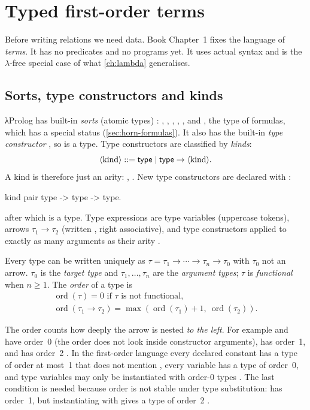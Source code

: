 \section{Typed first-order terms}\label{sec:horn-terms}

Before writing relations we need data. Book Chapter~1 fixes the language of \emph{terms}. It has no
predicates and no programs yet. It uses actual  syntax and is the $\lambda$-free special
case of what \cref{ch:lambda} generalises.

\subsection{Sorts, type constructors and kinds}

λProlog has built-in \emph{sorts} (atomic types) : , , ,
, , and , the type of formulas, which has a special status
(\cref{sec:horn-formulas}). It also has the built-in \emph{type constructor} , so 
is a type. Type constructors are classified by \emph{kinds}:
\[
  \langle\text{kind}\rangle ::= \mathsf{type} \mid \mathsf{type}\to\langle\text{kind}\rangle .
\]
A kind is therefore just an arity: , . New type constructors are
declared with  :
\begin{lprolog}
kind  pair  type -> type -> type.
\end{lprolog}
after which  is a type. Type expressions are type variables (uppercase tokens),
arrows $\tau_1\to\tau_2$ (written \lp{->}, right associative), and type constructors applied to exactly as
many arguments as their arity .

\begin{definition}\label{def:horn-order}
Every type can be written uniquely as $\tau=\tau_1\to\cdots\to\tau_n\to\tau_0$ with $\tau_0$ not an arrow.
$\tau_0$ is the \emph{target type} and $\tau_1,\dots,\tau_n$ are the \emph{argument types}; $\tau$ is
\emph{functional} when $n\ge1$. The \emph{order} of a type is
\begin{gather*}
  \operatorname{ord}(\tau)=0 \text{ if $\tau$ is not functional},\\
  \operatorname{ord}(\tau_1\to\tau_2)=\max(\operatorname{ord}(\tau_1)+1,\ \operatorname{ord}(\tau_2)).
\end{gather*}
\end{definition}
The order counts how deeply the arrow is nested \emph{to the left}. For example  and
 have order~0 (the order does not look inside constructor arguments),
 has order~1, and  has order~2 . In the
first-order language every declared constant has a type of order at most~1 that does not mention
, every variable has a type of order~0, and type variables may only be instantiated with order-0
types . The last condition is needed because order is not stable under type substitution:
 has order~1, but instantiating  with  gives a type of
order~2 .

